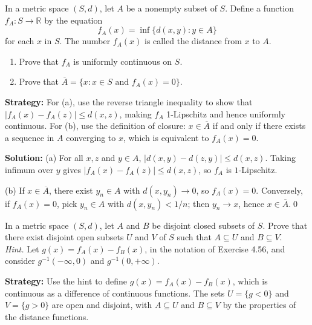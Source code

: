 \begin{problembox}
\begin{problemstatement}
In a metric space $(S, d)$, let $A$ be a nonempty subset of $S$. Define a function $f_A : S \to \mathbb{R}$ by the equation
\[f_A(x) = \inf \{d(x, y) : y \in A\}\]
for each $x$ in $S$. The number $f_A(x)$ is called the distance from $x$ to $A$.
\begin{enumerate}[label=(\alph*)]
\item Prove that $f_A$ is uniformly continuous on $S$.
\item Prove that $\overline{A} = \{x : x \in S \text{ and } f_A(x) = 0\}$.
\end{enumerate}
\end{problemstatement}
\end{problembox}

\noindent\textbf{Strategy:} For (a), use the reverse triangle inequality to show that $|f_A(x) - f_A(z)| \leq d(x,z)$, making $f_A$ 1-Lipschitz and hence uniformly continuous. For (b), use the definition of closure: $x \in \overline{A}$ if and only if there exists a sequence in $A$ converging to $x$, which is equivalent to $f_A(x) = 0$.

\bigskip\noindent\textbf{Solution:}
(a) For all $x,z$ and $y\in A$, $|d(x,y)-d(z,y)|\le d(x,z)$. Taking infimum over $y$ gives $|f_A(x)-f_A(z)|\le d(x,z)$, so $f_A$ is $1$-Lipschitz.

(b) If $x\in\overline{A}$, there exist $y_n\in A$ with $d(x,y_n)\to 0$, so $f_A(x)=0$. Conversely, if $f_A(x)=0$, pick $y_n\in A$ with $d(x,y_n)<1/n$; then $y_n\to x$, hence $x\in\overline{A}$.\qed



\begin{problembox}
\begin{problemstatement}
In a metric space $(S, d)$, let $A$ and $B$ be disjoint closed subsets of $S$. Prove that there exist disjoint open subsets $U$ and $V$ of $S$ such that $A \subseteq U$ and $B \subseteq V$. \\
\textit{Hint.} Let $g(x) = f_A(x) - f_B(x)$, in the notation of Exercise 4.56, and consider $g^{-1}(-\infty, 0)$ and $g^{-1}(0, +\infty)$.
\end{problemstatement}
\end{problembox}

\noindent\textbf{Strategy:} Use the hint to define $g(x) = f_A(x) - f_B(x)$, which is continuous as a difference of continuous functions. The sets $U = \{g < 0\}$ and $V = \{g > 0\}$ are open and disjoint, with $A \subseteq U$ and $B \subseteq V$ by the properties of the distance functions.

